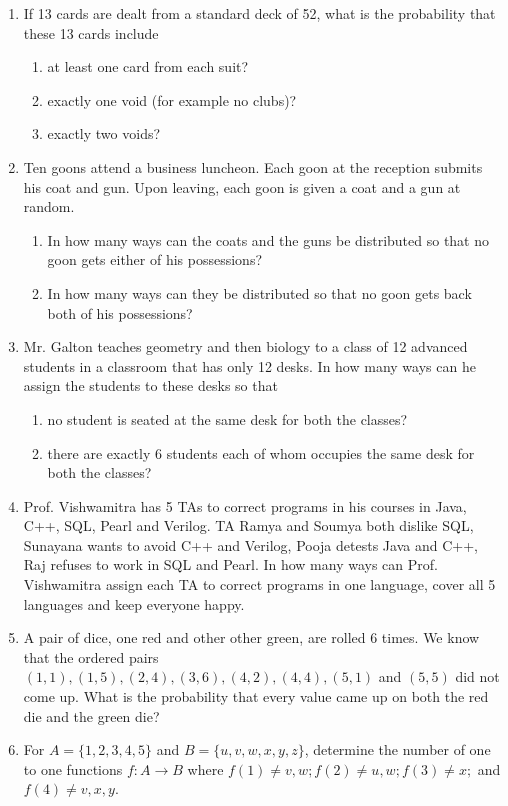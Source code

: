 \documentclass[a4paper]{article}
\begin{document}
\begin{enumerate}
\item If 13 cards are dealt from a standard deck of 52, what is the probability that these 13 cards include \begin{enumerate}
	\item at least one card from each suit?
	\item exactly one void (for example no clubs)?
	\item exactly two voids?
\end{enumerate} 
\item Ten goons attend a business luncheon. Each goon at the reception submits his coat and gun. Upon leaving, each goon is given a coat and a gun at random. 
	\begin{enumerate}
		\item In how many ways can the coats and the guns be distributed so that no goon gets either of his possessions?
		\item In how many ways can they be distributed so that no goon gets back both of his possessions?
	\end{enumerate}
\item Mr. Galton teaches geometry and then biology to a class of 12 advanced students in a classroom that has only 12 desks. In how many ways can he assign the students to these desks so that \begin{enumerate}
	\item no student is seated at the same desk for both the classes?
	\item there are exactly 6 students each of whom occupies the same desk for both the classes?
\end{enumerate}


\item Prof. Vishwamitra has 5 TAs to correct programs in his courses in Java, C++, SQL, Pearl and Verilog. TA Ramya and Soumya both dislike SQL, Sunayana wants to avoid C++ and Verilog, Pooja detests Java and C++, Raj refuses to work in SQL and Pearl. In how many ways can Prof. Vishwamitra assign each TA to correct programs in one language, cover all 5 languages and keep everyone happy.  

\item A pair of dice, one red and other other green, are rolled 6 times. We know that the ordered pairs $(1,1),(1,5),(2,4),(3,6),(4,2),(4,4),(5,1)$ and $(5,5) $ did not come up. What is the probability that every value came up on both the red die and the green die?

\item For $A=\{1,2,3,4,5\}$ and $B=\{u,v,w,x,y,z\}$, determine the number of one to one functions $f:A\rightarrow B$ where $f(1)\neq v,w;f(2)\neq u,w;f(3)\neq x;$ and $f(4)\neq v,x,y$.











\end{enumerate}
\end{document}
